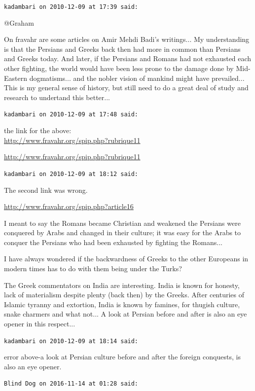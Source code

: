 \begin{footnotesize}
\begin{sffamily}
\hfill

\texttt{kadambari on 2010-12-09 at 17:39 said:}

@Graham

On fravahr are some articles on Amir Mehdi Badi's writings... My understanding is that the Persians and Greeks back then had more in common than Persians and Greeks today. And later, if the Persians and Romans had not exhausted each other fighting, the world would have been less prone to the damage done by Mid-Eastern dogmatisms... and the nobler vision of mankind might have prevailed... This is my general sense of history, but still need to do a great deal of study and research to undertand this better... 

\hfill

\texttt{kadambari on 2010-12-09 at 17:48 said:}

the link for the above:\\
\url{http://www.fravahr.org/spip.php?rubrique11}


\url{http://www.fravahr.org/spip.php?rubrique11}


\hfill

\texttt{kadambari on 2010-12-09 at 18:12 said:}

The second link was wrong.

\url{http://www.fravahr.org/spip.php?article16}


I meant to say the Romans became Christian and weakened the Persians were conquered by Arabs and changed in their culture; it was easy for the Arabs to conquer the Persians who had been exhausted by fighting the Romans... 

I have always wondered if the backwardness of Greeks to the other Europeans in modern times has to do with them being under the Turks?

The Greek commentators on India are interesting. India is known for honesty, lack of materialism despite plenty (back then) by the Greeks. After centuries of Islamic tyranny and extortion, India is known by famines, for thugish culture, snake charmers and what not... A look at Persian before and after is also an eye opener in this respect... 

\hfill

\texttt{kadambari on 2010-12-09 at 18:14 said:}

error above-a look at Persian culture before and after the foreign conquests, is also an eye opener.

\hfill

\texttt{Blind Dog on 2016-11-14 at 01:28 said:}


\end{sffamily}
\end{footnotesize}
